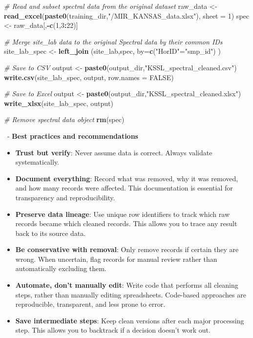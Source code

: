 \documentclass[
  10pt,
  b5paper,
  oneside]{book}
\newenvironment{Shaded}{\begin{snugshade}}{\end{snugshade}}
\newcommand{\AttributeTok}[1]{\textcolor[rgb]{0.13,0.29,0.53}{#1}}
\newcommand{\CommentTok}[1]{\textcolor[rgb]{0.56,0.35,0.01}{\textit{#1}}}
\newcommand{\ConstantTok}[1]{\textcolor[rgb]{0.56,0.35,0.01}{#1}}
\newcommand{\DecValTok}[1]{\textcolor[rgb]{0.00,0.00,0.81}{#1}}
\newcommand{\FunctionTok}[1]{\textcolor[rgb]{0.13,0.29,0.53}{\textbf{#1}}}
\newcommand{\NormalTok}[1]{#1}
\newcommand{\OtherTok}[1]{\textcolor[rgb]{0.56,0.35,0.01}{#1}}
\newcommand{\SpecialCharTok}[1]{\textcolor[rgb]{0.81,0.36,0.00}{\textbf{#1}}}
\newcommand{\StringTok}[1]{\textcolor[rgb]{0.31,0.60,0.02}{#1}}
\begin{document}
\begin{Shaded}
\begin{Highlighting}[]
\CommentTok{\# Read and subset spectral data from the original dataset}
\NormalTok{raw\_data }\OtherTok{\textless{}{-}} \FunctionTok{read\_excel}\NormalTok{(}\FunctionTok{paste0}\NormalTok{(training\_dir,}\StringTok{"/MIR\_KANSAS\_data.xlsx"}\NormalTok{), }\AttributeTok{sheet =} \DecValTok{1}\NormalTok{) }
\NormalTok{spec }\OtherTok{\textless{}{-}}\NormalTok{ raw\_data[,}\SpecialCharTok{{-}}\FunctionTok{c}\NormalTok{(}\DecValTok{1}\NormalTok{,}\DecValTok{3}\SpecialCharTok{:}\DecValTok{22}\NormalTok{)]}

\CommentTok{\# Merge site\_lab data to the original Spectral data by their common IDs}
\NormalTok{site\_lab\_spec }\OtherTok{\textless{}{-}} \FunctionTok{left\_join}\NormalTok{ (site\_lab,spec, }\AttributeTok{by=}\FunctionTok{c}\NormalTok{(}\StringTok{"HorID"}\OtherTok{=}\StringTok{"smp\_id"}\NormalTok{) )}

\CommentTok{\# Save to CSV}
\NormalTok{output }\OtherTok{\textless{}{-}} \FunctionTok{paste0}\NormalTok{(output\_dir,}\StringTok{"KSSL\_spectral\_cleaned.csv"}\NormalTok{)}
\FunctionTok{write.csv}\NormalTok{(site\_lab\_spec, output, }\AttributeTok{row.names =} \ConstantTok{FALSE}\NormalTok{)}

\CommentTok{\# Save to Excel}
\NormalTok{output }\OtherTok{\textless{}{-}} \FunctionTok{paste0}\NormalTok{(output\_dir,}\StringTok{"KSSL\_spectral\_cleaned.xlsx"}\NormalTok{)}
\FunctionTok{write\_xlsx}\NormalTok{(site\_lab\_spec, output)}

\CommentTok{\# Remove spectral data object}
\FunctionTok{rm}\NormalTok{(spec)}
\end{Highlighting}
\end{Shaded}

~- \textbf{Best practices and recommendations}

\begin{itemize}
\item
  \textbf{Trust but verify}: Never assume data is correct. Always validate systematically.
\item
  \textbf{Document everything}: Record what was removed, why it was removed, and how many records were affected. This documentation is essential for transparency and reproducibility.
\item
  \textbf{Preserve data lineage}: Use unique row identifiers to track which raw records became which cleaned records. This allows you to trace any result back to its source data.
\item
  \textbf{Be conservative with removal}: Only remove records if certain they are wrong. When uncertain, flag records for manual review rather than automatically excluding them.
\item
  \textbf{Automate, don't manually edit}: Write code that performs all cleaning steps, rather than manually editing spreadsheets. Code-based approaches are reproducible, transparent, and less prone to error.
\item
  \textbf{Save intermediate steps}: Keep clean versions after each major processing step. This allows you to backtrack if a decision doesn't work out.
\end{itemize}
\end{document}

